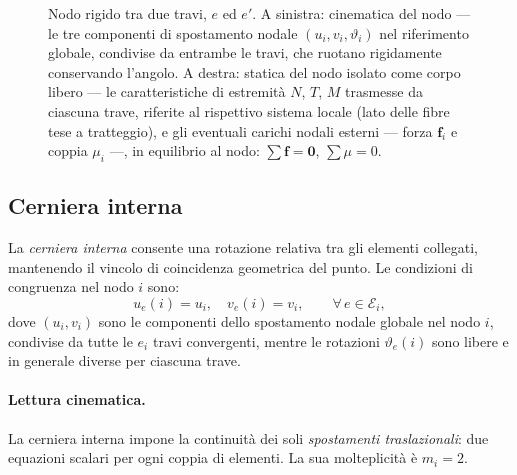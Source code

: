 \begin{figure}[htbp]
{
	}%
	\caption{Nodo rigido tra due travi, $e$ ed $e'$. A sinistra:
		cinematica del nodo --- le tre componenti di spostamento
		nodale $(u_i, v_i, \vartheta_i)$ nel riferimento globale,
		condivise da entrambe le travi, che ruotano rigidamente
		conservando l'angolo. A destra: statica del nodo isolato
		come corpo libero --- le caratteristiche di estremità
		$N$, $T$, $M$ trasmesse da ciascuna trave, riferite al
		rispettivo sistema locale (lato delle fibre tese a
		tratteggio), e gli eventuali carichi nodali esterni ---
		forza $\mathbf{f}_i$ e coppia $\mu_i$ ---, in equilibrio
		al nodo: $\sum\mathbf{f}=\mathbf{0}$, $\sum \mu= 0$.}
	\label{fig:nodo_rigido}
\end{figure}



\subsection{Cerniera interna}
\label{subsec:cerniera_interna}

La \emph{cerniera interna} consente una rotazione relativa
tra gli elementi collegati, mantenendo il vincolo di
coincidenza geometrica del punto. Le condizioni di
congruenza nel nodo $i$ sono:
\begin{equation}\label{eq:cong_cerniera}
	u_e(i) = u_i, \quad
	v_e(i) = v_i, \qquad \forall\, e \in \mathcal{E}_i,
\end{equation}
dove $(u_i, v_i)$ sono le componenti dello spostamento
nodale globale nel nodo $i$, condivise da tutte le $e_i$
travi convergenti, mentre le rotazioni $\vartheta_e(i)$
sono libere e in generale diverse per ciascuna trave.

\paragraph{Lettura cinematica.}
La cerniera interna impone la continuità dei soli
\emph{spostamenti traslazionali}: due equazioni scalari
per ogni coppia di elementi. La sua molteplicità è
$m_i = 2$.

